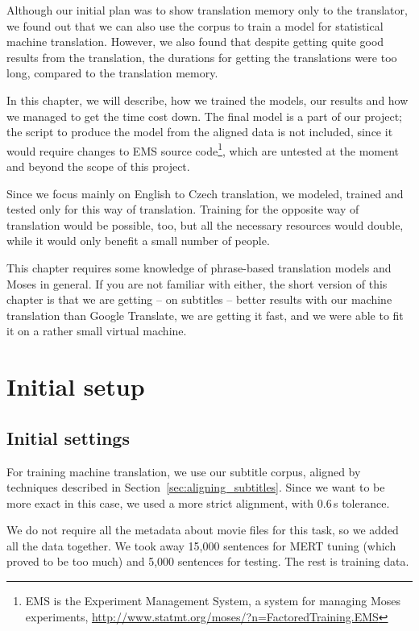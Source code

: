 \label{chap:moses}

Although our initial plan was to show translation memory only to the translator, we found out that we can also use the corpus to train a model for statistical machine translation. However, we also found that despite getting quite good results from the translation, the durations for getting the translations were too long, compared to the translation memory.

In this chapter, we will describe, how we trained the models, our results and how we managed to get the time cost down. The final model is a part of our project; the script to produce the model from the aligned data is not included, since it would require changes to EMS source code\footnote{EMS is the Experiment Management System, a system for managing Moses experiments, \url{http://www.statmt.org/moses/?n=FactoredTraining.EMS}}, which are untested at the moment and beyond the scope of this project.

Since we focus mainly on English to Czech translation, we modeled, trained and tested only for this way of translation. Training for the opposite way of translation would be possible, too, but all the necessary resources would double, while it would only benefit a small number of people.

This chapter requires some knowledge of phrase-based translation models and Moses in general. If you are not familiar with either, the short version of this chapter is that we are getting -- on subtitles -- better results with our machine translation than Google Translate, we are getting it fast, and we were able to fit it on a rather small virtual machine.


\section{Initial setup}
\subsection{Initial settings}

For training machine translation, we use our subtitle corpus, aligned by techniques described in Section~\ref{sec:aligning_subtitles}. Since we want to be more exact in this case, we used a more strict alignment, with 0.6\,s tolerance.

We do not require all the metadata about movie files for this task, so we added all the data together. We took away 15,000 sentences for MERT tuning (which proved to be too much) and 5,000 sentences for testing. The rest is training data.


